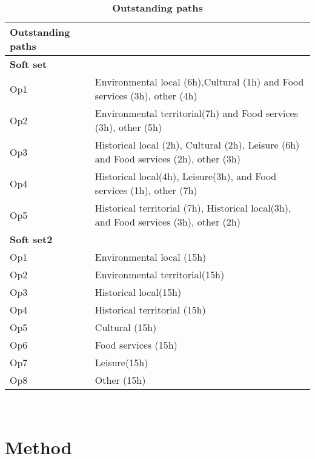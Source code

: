 \documentclass[a4paper]{article}
\begin{document}
\begin{table}[h]
\centering
\begin{tabular}{ll}
\hline
\textbf{Outstanding paths}\\
\hline
\textbf{Soft set}\\
\parbox{2cm}{Op1}&\parbox{8cm}{Environmental local (6h),Cultural (1h) and Food services (3h), other (4h)}\\
\parbox{2cm}{Op2}&\parbox{8cm}{Environmental territorial(7h) and Food services (3h), other (5h)}\\
\parbox{2cm}{Op3}&\parbox{8cm}{Historical local (2h), Cultural (2h), Leisure (6h) and Food services (2h), other (3h)}\\
\parbox{2cm}{Op4}&\parbox{8cm}{Historical local(4h), Leisure(3h), and Food services (1h), other (7h)}\\
\parbox{2cm}{Op5}&\parbox{8cm}{Historical territorial (7h), Historical local(3h), and Food services (3h), other (2h)}\\
\hline
\textbf{Soft set2}\\
\parbox{2cm}{Op1}&\parbox{8cm}{Environmental local (15h)}\\
\parbox{2cm}{Op2}&\parbox{8cm}{Environmental territorial(15h)}\\
\parbox{2cm}{Op3}&\parbox{8cm}{Historical local(15h)}\\
\parbox{2cm}{Op4}&\parbox{8cm}{Historical territorial (15h)}\\
\parbox{2cm}{Op5}&\parbox{8cm}{Cultural (15h)}\\
\parbox{2cm}{Op6}&\parbox{8cm}{Food services (15h)}\\
\parbox{2cm}{Op7}&\parbox{8cm}{Leisure(15h)}\\
\parbox{2cm}{Op8}&\parbox{8cm}{Other (15h)}\\
\hline
\end{tabular}
\caption{\textbf{Outstanding paths}}\
\label{Table}
\end{table}





\section{Method}
\end{document}

